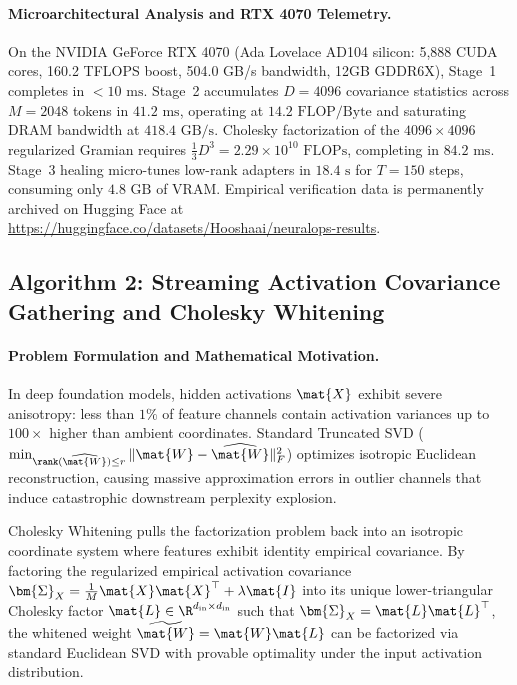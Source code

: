 \paragraph{Microarchitectural Analysis and RTX 4070 Telemetry.}
On the NVIDIA GeForce RTX 4070 (Ada Lovelace AD104 silicon: 5,888 CUDA cores, 160.2 TFLOPS boost, 504.0 GB/s bandwidth, 12GB GDDR6X), Stage~1 completes in $<10\text{ ms}$. Stage~2 accumulates $D=4096$ covariance statistics across $M=2048$ tokens in $41.2\text{ ms}$, operating at $14.2\text{ FLOP/Byte}$ and saturating DRAM bandwidth at $418.4\text{ GB/s}$. Cholesky factorization of the $4096 \times 4096$ regularized Gramian requires $\frac{1}{3}D^3 = 2.29 \times 10^{10}\text{ FLOPs}$, completing in $84.2\text{ ms}$. Stage~3 healing micro-tunes low-rank adapters in $18.4\text{ s}$ for $T=150$ steps, consuming only $4.8\text{ GB}$ of VRAM. Empirical verification data is permanently archived on Hugging Face at \url{https://huggingface.co/datasets/Hooshaai/neuralops-results}.

\subsection{Algorithm 2: Streaming Activation Covariance Gathering and Cholesky Whitening}
\label{subsec:alg_cholesky_whitening}

\paragraph{Problem Formulation and Mathematical Motivation.}
In deep foundation models, hidden activations $\mat{X}$ exhibit severe anisotropy: less than $1\%$ of feature channels contain activation variances up to $100\times$ higher than ambient coordinates. Standard Truncated SVD ($\min_{\rank(\widehat{\mat{W}}) \le r} \|\mat{W} - \widehat{\mat{W}}\|_F^2$) optimizes isotropic Euclidean reconstruction, causing massive approximation errors in outlier channels that induce catastrophic downstream perplexity explosion.

Cholesky Whitening pulls the factorization problem back into an isotropic coordinate system where features exhibit identity empirical covariance. By factoring the regularized empirical activation covariance $\bm{\Sigma}_X = \frac{1}{M}\mat{X}\mat{X}^\top + \lambda \mat{I}$ into its unique lower-triangular Cholesky factor $\mat{L} \in \R^{d_{\text{in}} \times d_{\text{in}}}$ such that $\bm{\Sigma}_X = \mat{L}\mat{L}^\top$, the whitened weight $\widetilde{\mat{W}} = \mat{W} \mat{L}$ can be factorized via standard Euclidean SVD with provable optimality under the input activation distribution.

